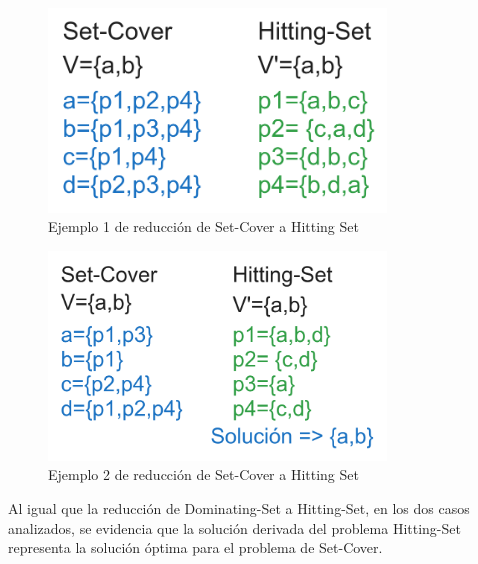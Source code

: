 \begin{figure}[H]
    \centering
    \includegraphics[width=0.8\textwidth]{img/ejemplo1_SC-HS.png}
    \caption{Ejemplo 1 de reducción de Set-Cover a Hitting Set}
    \label{fig:ejemplo1_DS-HS}
\end{figure}

\begin{figure}[H]
    \centering
    \includegraphics[width=0.8\textwidth]{img/ejemplo2_SC-HS.png}
    \caption{Ejemplo 2 de reducción de Set-Cover a Hitting Set}
    \label{fig:ejemplo2_DS-HS}
\end{figure}

Al igual que la reducción de Dominating-Set a Hitting-Set, en los dos casos analizados, se evidencia que la solución derivada del problema Hitting-Set representa la solución óptima para el problema de Set-Cover.




